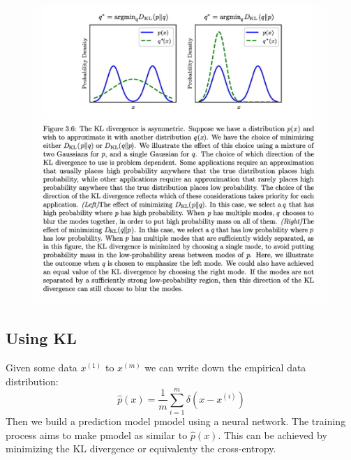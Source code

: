 \documentclass[../Main.tex]{subfiles}
\begin{document}
\begin{figure}[H]
    \centering
    \includegraphics[width=1\linewidth]{Images/kl-divergence-simmetry.png}
\end{figure}


\subsection{Using KL}
Given some data \(x^{(1)}\) to \(x^{(m)}\) we can write down the empirical data distribution:
\begin{equation*}
    \hat{p}(x) = \frac{1}{m} \sum_{i=1}^{m} \delta (x -x^{(i)})
\end{equation*}
Then we build a prediction model pmodel using a neural network.
The training process aims to make pmodel as similar to \(\hat{p}(x)\).
This can be achieved by minimizing the KL divergence or equivalenty the cross-entropy.
\end{document}
